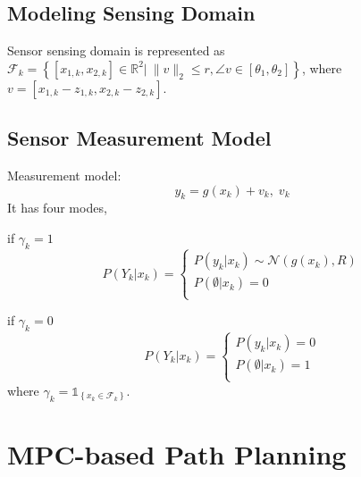 \documentclass[letterpaper, 10 pt, conference]{ieeeconf}  %
\begin{document}
\subsection{Modeling Sensing Domain}
Sensor sensing domain is represented as $\mathcal{F}_k=\left\lbrace [x_{1,k},x_{2,k}]\in\mathbb{R}^2|\:\|v\|_2\leq r, \angle v\in[\theta_1,\theta_2]\right\rbrace$, where $v=[x_{1,k}-z_{1,k},x_{2,k}-z_{2,k}]$.

\subsection{Sensor Measurement Model}
Measurement model:
\begin{equation}
y_{k}=g(x_k)+v_k,\;v_k
\end{equation}
It has four modes,

if $\gamma_k=1$
\begin{equation}\label{eqn:sensor_infov}
	P(Y_k|x_k)=
	\begin{cases}
		P(y_k|x_k)\sim \mathcal{N}(g(x_k),R)\\
		P(\emptyset|x_k)=0\\	
	\end{cases}
\end{equation}

if $\gamma_k=0$
\begin{equation}\label{eqn:sensor_outfov}
P(Y_k|x_k)=
\begin{cases}
P(y_k|x_k)=0\\
P(\emptyset|x_k)=1\\	
\end{cases}
\end{equation}
where $
\gamma_{k}=\mathds{1}_{\left\lbrace x_{k}\in\mathcal{F}_{k}\right\rbrace}$.

\section{MPC-based Path Planning}\label{sec:method}
\end{document}

